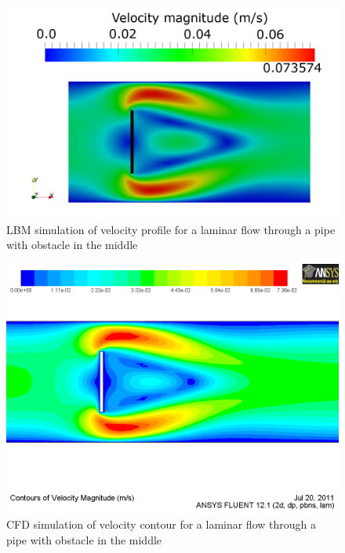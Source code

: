 \begin{figure}[htbp]
\centering
\includegraphics[width=\textwidth]{Chapter3/figures/lbm/LBM_Obstacle.png}
\caption{LBM simulation of velocity profile for a laminar flow through a pipe with obstacle in the middle}
\label{fig:Obstacle}
\end{figure}

\begin{figure}[htbp]
\centering
\includegraphics[width=\textwidth]{Chapter3/figures/lbm/CFD_Obstacle.png}
\caption{CFD simulation of velocity contour for a laminar flow through a pipe with obstacle in the middle}
\label{fig:obsvc}
\end{figure}


